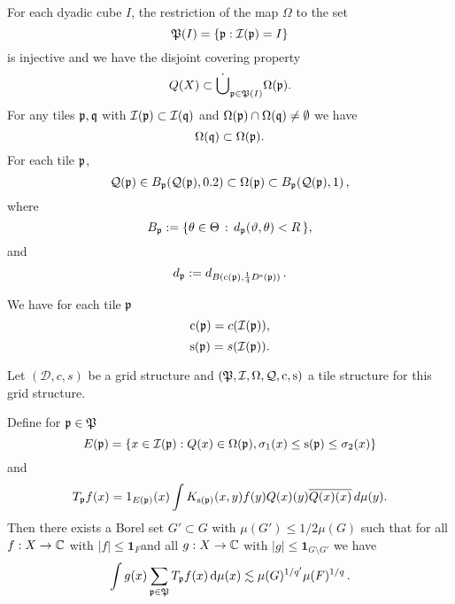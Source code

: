 For each dyadic cube $I$, the restriction of the  map $\Omega$ to the set
\begin{equation}\label{injective}
    \mathfrak P(I)=\{\mathfrak p: \mathcal{I}(\mathfrak p) =I\}
\end{equation}
is injective
and we have the disjoint covering property
\begin{equation}\label{eq dis freq cover}
{Q}(X)\subset \dot{\bigcup}_{\mathfrak p\in \mathfrak P(I)}\Omega(\mathfrak p).
\end{equation}
For any tiles $\mathfrak p,\mathfrak q$ with $\mathcal{I}(\mathfrak p)\subset \mathcal{I}(\mathfrak q)$ and $\Omega(\mathfrak p) \cap \Omega(\mathfrak q) \neq  \emptyset$ we have
\begin{equation} \label{eq freq dyadic}
\Omega(\mathfrak q)\subset \Omega(\mathfrak p) .
\end{equation}
For each tile $\mathfrak p$,
        \begin{equation}\label{eq freq comp ball}
        \mathcal{Q}(\mathfrak p)\in B_{\mathfrak p}(\mathcal{Q}(\mathfrak p), 0.2) \subset \Omega(\mathfrak p) \subset B_{\mathfrak p}(\mathcal{Q}(\mathfrak p),1)\,,
        \end{equation}
        where
\begin{equation}
    B_{\mathfrak p} := \{\theta \in \Theta \, : \, d_{\mathfrak p}(\vartheta, \theta) < R\,\} ,
\end{equation}
 and
\begin{equation}\label{defdp}
d_{\mathfrak p} := d_{B(\mathrm{c}(\mathfrak p),\frac 14 D^{\mathrm{s}}(\mathfrak p))}\, .
\end{equation}




We have for each tile $\mathfrak p$
\begin{equation}\label{tilecenter}
    \mathrm{c}(\mathfrak p)=c(\mathcal{I}(\mathfrak p)),
\end{equation}
\begin{equation}\label{tilescale}
    \mathrm{s}(\mathfrak p)=s(\mathcal{I}(\mathfrak p)).
\end{equation}


\begin{prop}
\label{prop dyadic}
Let $(\mathcal{D}, c, s)$ be a grid structure and $(\mathfrak P,\mathcal{I},\Omega,\mathcal{Q},\mathrm{c},\mathrm{s})$
a tile structure  for this grid structure.

Define for $\mathfrak p\in \mathfrak P$
\begin{equation}\label{defineep}
    E(\mathfrak p)=\{x\in \mathcal{I}(\mathfrak p): {Q}(x)\in \Omega(\mathfrak p) , {\sigma_1}(x)\le \mathrm{s}(\mathfrak p)\le {\sigma_2}(x)\}
\end{equation}
and
\begin{equation}\label{definetp}
    T_{\mathfrak p} f(x)= 1_{E(\mathfrak p)}(x) \int   K_{\mathrm{s}(\mathfrak p)}(x,y) f(y) {Q}(x)(y)\overline{{Q}(x)(x)}\, d\mu(y).
\end{equation}
Then there exists a Borel set $G'\subset G$ with $\mu(G') \leq 1/2\mu(G)$ such that for all $f:X\to \mathbb{C}$ with $|f|\le \mathbf{1}_F$and all
$g:X\to \mathbb{C}$ with $|g|\le \mathbf{1}_{G\setminus G'}$
we have
\begin{equation}
    \label{disclesssim}
   \int g(x) \sum_{\mathfrak p \in \mathfrak P} T_{\mathfrak p} f (x) \, \mathrm{d}\mu(x)  \lesssim \mu(G)^{1/q'} \mu(F)^{1/q}\,.
\end{equation}
\end{prop}

